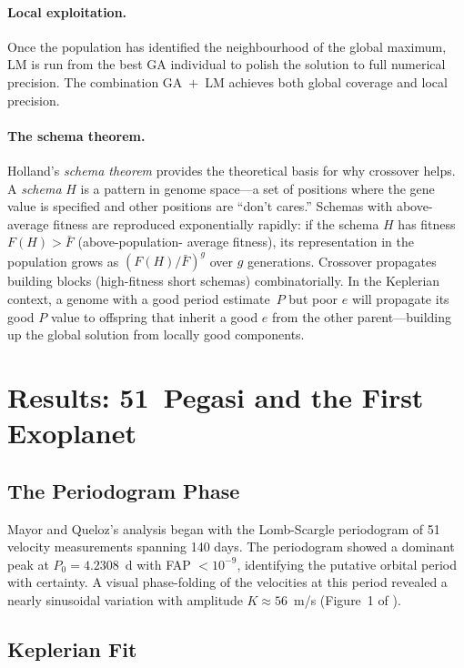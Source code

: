 \documentclass[12pt]{article}
\begin{document}
\paragraph{Local exploitation.}
Once the population has identified the neighbourhood of the global
maximum, LM is run from the best GA individual to polish the solution
to full numerical precision.  The combination GA~$+$~LM achieves both
global coverage and local precision.

\paragraph{The schema theorem.}
Holland's \citeyearpar{Holland1975} \emph{schema theorem} provides
the theoretical basis for why crossover helps.  A \emph{schema}
$H$ is a pattern in genome space---a set of positions where the
gene value is specified and other positions are ``don't cares.''
Schemas with above-average fitness are reproduced exponentially
rapidly: if the schema $H$ has fitness $F(H) > \bar F$ (above-population-
average fitness), its representation in the population grows as
$(F(H)/\bar F)^g$ over $g$ generations.  Crossover propagates
building blocks (high-fitness short schemas) combinatorially.
In the Keplerian context, a genome with a good period estimate~$P$
but poor $e$ will propagate its good $P$ value to offspring that
inherit a good $e$ from the other parent---building up the global
solution from locally good components.

\section{Results: 51~Pegasi and the First Exoplanet}
\label{sec:51peg}

\subsection{The Periodogram Phase}

Mayor and Queloz's analysis began with the Lomb-Scargle periodogram
of 51 velocity measurements spanning 140 days.  The periodogram showed
a dominant peak at $P_0 = 4.2308$~d with FAP $< 10^{-9}$, identifying
the putative orbital period with certainty.  A visual phase-folding
of the velocities at this period revealed a nearly sinusoidal variation
with amplitude $K \approx 56$~m/s (Figure~1 of \citealt{Mayor1995}).

\subsection{Keplerian Fit}
\end{document}
